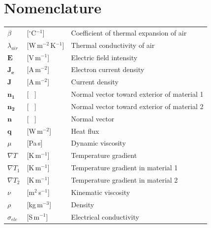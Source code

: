 \documentclass[review,times,sagev,doublespace]{sagej}
\begin{document}
\section{Nomenclature}

\begin{longtable*}[c]{p{2cm} p{2cm} l}
		$\beta$				& [$^{\circ}$C$^{-1}$] 		& Coefficient of thermal expansion of air                     \\
		$\lambda_{air}$		& [W\,m$^{-2}$\,K$^{-1}$] 	& Thermal conductivity of air                                 \\
		$\mathbf{E}$		& [V\,m$^{-1}$] 			& Electric field intensity                                    \\
		$\mathbf{J_e}$ 		& [A\,m$^{-2}$] 			& Electron current density                                    \\
		$\mathbf{J}$        & [A\,m$^{-2}$] 			& Current density                                             \\
		$\mathbf{n_1}$ 		& [ \ ] 					& Normal vector toward exterior of material 1                 \\
		$\mathbf{n_2}$ 		& [ \ ] 					& Normal vector toward exterior of material 2                 \\
		$\mathbf{n}$ 		& [ \ ] 					& Normal vector                                               \\
		$\mathbf{q}$ 		& [W\,m$^{-2}$] 			& Heat flux                                                   \\
		$\mu$ 				& [Pa\,s] 					& Dynamic viscosity                                           \\
		$\nabla T$			& [K\,m$^{-1}$] 			& Temperature gradient                                        \\
		$\nabla T_1$ 		& [K\,m$^{-1}$] 			& Temperature gradient in material 1                          \\
		$\nabla T_2$ 		& [K\,m$^{-1}$] 			& Temperature gradient in material 2                          \\
		$\nu$ 				& [m$^2$\,s$^{-1}$] 		& Kinematic viscosity                                         \\
		$\rho$ 				& [kg\,m$^{-3}$] 			& Density                                                     \\
		$\sigma_{ele}$ 		& [S\,m$^{-1}$] 			& Electrical conductivity                                     \\

\end{longtable*}
\end{document}

